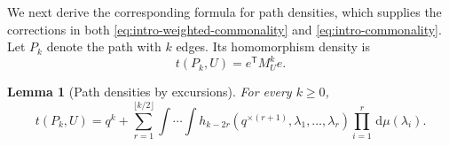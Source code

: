 \documentclass[11pt]{article}
\newtheorem{lemma}[theorem]{Lemma}
\numberwithin{equation}{section}
\newcommand{\dd}{\,\mathrm d}
\newcommand{\tP}[2]{t(P_{#1},#2)}
\newcommand{\rep}[2]{#1^{\times #2}}
\begin{document}
We next derive the corresponding formula for path densities, which supplies the corrections in both \eqref{eq:intro-weighted-commonality} and \eqref{eq:intro-commonality}.
Let $P_k$ denote the path with $k$ edges. Its homomorphism density is
\begin{equation*}
  \tP kU=e^{\mathsf T}M_U^ke.
\end{equation*}

\begin{lemma}[Path densities by excursions]
\label{lem:path-excursions}
  For every $k\ge0$,
  \begin{equation}\label{eq:path-expansion}
    \tP kU=q^k+
    \sum_{r=1}^{\lfloor k/2\rfloor}
      \int\!\cdots\!\int
      h_{k-2r}(\rep q{(r+1)},\lambda_1,\ldots,\lambda_r)
      \prod_{i=1}^r\dd\mu(\lambda_i).
  \end{equation}
\end{lemma}
\end{document}

